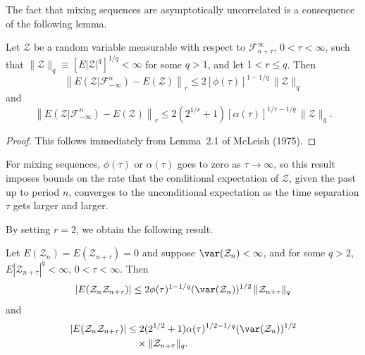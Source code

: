 The fact that mixing sequences are asymptotically uncorrelated is a consequence of the following lemma.

\begin{lemma}\label{lem:6.16}
Let $\mathcal{Z}$ be a random variable measurable with respect to $\mathcal{F}_{n+\tau}^\infty$, $0 < \tau < \infty$, such that $\|\mathcal{Z}\|_q \equiv [E|\mathcal{Z}|^q]^{1/q} < \infty$ for some $q > 1$, and let $1 < r \leq q$. Then
\[
  \left\|E(\mathcal{Z}|\mathcal{F}_{-\infty}^n) - E(\mathcal{Z})\right\|_r \leq 2[\phi(\tau)]^{1-1/q}\,\|\mathcal{Z}\|_q
\]
and
\[
  \left\|E(\mathcal{Z}|\mathcal{F}_{-\infty}^n) - E(\mathcal{Z})\right\|_r \leq 2(2^{1/r}+1)[\alpha(\tau)]^{1/r - 1/q}\,\|\mathcal{Z}\|_q.
\]
\end{lemma}

\begin{proof}
This follows immediately from Lemma~2.1 of McLeish (1975).
\end{proof}

For mixing sequences, $\phi(\tau)$ or $\alpha(\tau)$ goes to zero as $\tau \to \infty$, so this result imposes bounds on the rate that the conditional expectation of $\mathcal{Z}$, given the past up to period $n$, converges to the unconditional expectation as the time separation $\tau$ gets larger and larger.

By setting $r = 2$, we obtain the following result.

\begin{corollary}\label{cor:6.17}
Let $E(\mathcal{Z}_n) = E(\mathcal{Z}_{n+\tau}) = 0$ and suppose $\var(\mathcal{Z}_n) < \infty$, and for some $q > 2$, $E|\mathcal{Z}_{n+\tau}|^q < \infty$, $0 < \tau < \infty$. Then
\[
  |E(\mathcal{Z}_n\mathcal{Z}_{n+\tau})| \leq 2\phi(\tau)^{1-1/q}(\var(\mathcal{Z}_n))^{1/2}\,\|\mathcal{Z}_{n+\tau}\|_q
\]
and
\begin{align*}
  |E(\mathcal{Z}_n\mathcal{Z}_{n+\tau})| &\leq 2(2^{1/2}+1)\alpha(\tau)^{1/2-1/q}(\var(\mathcal{Z}_n))^{1/2} \\
    &\quad \times\|\mathcal{Z}_{n+\tau}\|_q.
\end{align*}
\end{corollary}

